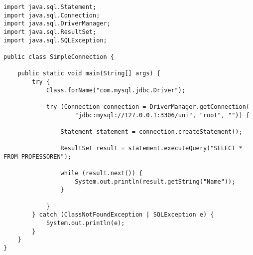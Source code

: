 \begin{lstlisting}[caption={JDBC Beispielprogramm},label=lst:jdbc_sample]
import java.sql.Statement;
import java.sql.Connection;
import java.sql.DriverManager;
import java.sql.ResultSet;
import java.sql.SQLException;

public class SimpleConnection {

    public static void main(String[] args) {
        try {
            Class.forName("com.mysql.jdbc.Driver");

            try (Connection connection = DriverManager.getConnection(
                    "jdbc:mysql://127.0.0.1:3306/uni", "root", "")) {

                Statement statement = connection.createStatement();

                ResultSet result = statement.executeQuery("SELECT * FROM PROFESSOREN");

                while (result.next()) {
                    System.out.println(result.getString("Name"));
                }

            }
        } catch (ClassNotFoundException | SQLException e) {
            System.out.println(e);
        }
    }
}
\end{lstlisting}